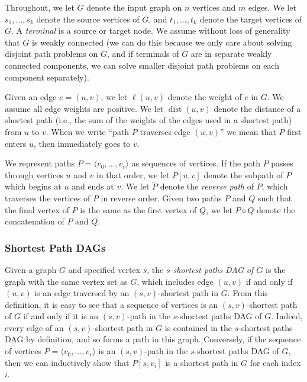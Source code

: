 \documentclass[11pt]{article}
\newcommand{\dia}{\diamond}
\DeclareMathOperator{\dist}{dist}
\newcommand{\rev}{\overleftarrow}
\theoremstyle{definition}
\begin{document}
Throughout, we let $G$ denote the input graph on $n$ vertices and $m$ edges.
We let $s_1, \dots, s_k$ denote the source vertices of $G$, and $t_1, \dots, t_k$ denote the target vertices of $G$.
A \emph{terminal} is a source or target node.
We assume without loss of generality that $G$ is weakly connected (we can do this because we only care about solving disjoint path problems on $G$, and if terminals of $G$ are in separate weakly connected components, we can solve smaller disjoint path problems on each component separately).

Given an edge $e = (u,v)$, we let $\ell(u,v)$ denote the weight of $e$ in $G$.
We assume all edge weights are positive.
We let $\dist(u,v)$ denote the distance of a shortest path (i.e., the sum of the weights of the edges used in a shortest path) from $u$ to $v$. 
When we write ``path $P$ traverses edge $(u,v)$'' we mean that $P$ first enters $u$, then immediately goes to $v$.

We represent paths $P = \langle v_0, \dots, v_r\rangle$ as sequences of vertices.
If the path $P$ passes through vertices $u$ and $v$ in that order, we let $P[u,v]$ denote the subpath of $P$ which begins at $u$ and ends at $v$. 
We let $\rev{P}$ denote the \emph{reverse path} of $P$, which traverses the vertices of $P$ in reverse order.
Given two paths $P$ and $Q$ such that the final vertex of $P$ is the same as the first vertex of $Q$, we let $P\dia Q$ denote the concatenation of $P$ and $Q$.



\subsubsection*{Shortest Path DAGs}

Given a graph $G$ and specified vertex $s$, the \emph{$s$-shortest paths DAG of $G$} is the graph with the same vertex set as $G$, which includes edge $(u,v)$ if and only if $(u,v)$ is an edge traversed by an $(s,v)$-shortest path in $G$.
From this definition, it is easy to see that a sequence of vertices is an $(s,v)$-shortest path of $G$ if and only if it is an $(s,v)$-path in the $s$-shortest paths DAG of $G$.
Indeed, every edge of an $(s,v)$-shortest path in $G$ is contained in the $s$-shortest paths DAG by definition, and so forms a path in this graph.
Conversely, if the sequence of vertices $P = \langle v_0, \dots, v_r\rangle$ is an $(s,v)$-path in the $s$-shortest paths DAG of $G$, then we can inductively show that $P[s,v_i]$ is a shortest path in $G$ for each index $i$.
\end{document}
